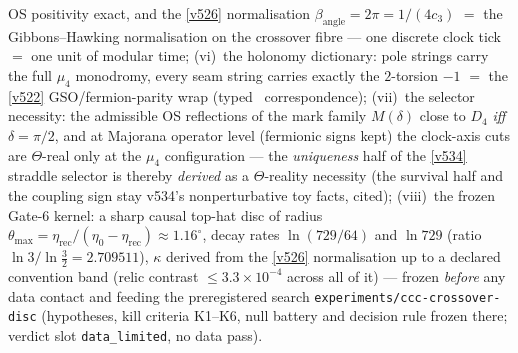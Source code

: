\documentclass[11pt,a4paper]{article}
\newcommand{\cthree}{c_3}
\begin{document}
OS positivity exact, and the \vref{v526} normalisation $\beta_{\mathrm{angle}}=2\pi=1/(4\cthree)$
$=$ the Gibbons--Hawking normalisation on the crossover fibre --- one discrete clock tick $=$ one
unit of modular time; (vi)~the holonomy dictionary: pole strings carry the full $\mu_4$ monodromy,
every seam string carries exactly the $2$-torsion $-1$ $=$ the \vref{v522} GSO/fermion-parity wrap
(typed \mC\ correspondence); (vii)~the selector necessity: the admissible OS reflections of the
mark family $M(\delta)$ close to $D_4$ \emph{iff} $\delta=\pi/2$, and at Majorana operator level
(fermionic signs kept) the clock-axis cuts are $\Theta$-real only at the $\mu_4$ configuration ---
the \emph{uniqueness} half of the \vref{v534} straddle selector is thereby \emph{derived} as a
$\Theta$-reality necessity (the survival half and the coupling sign stay v534's nonperturbative toy
facts, cited); (viii)~the frozen Gate-6 kernel: a sharp causal top-hat disc of radius
$\theta_{\max}=\eta_{\mathrm{rec}}/(\eta_0-\eta_{\mathrm{rec}})\approx1.16^\circ$, decay rates
$\ln(729/64)$ and $\ln729$ (ratio $\ln3/\ln\tfrac32=2.709511$), $\kappa$ derived from the
\vref{v526} normalisation up to a declared convention band (relic contrast $\le3.3\times10^{-4}$
across all of it) --- frozen \emph{before} any data contact and feeding the preregistered search
\texttt{experiments/ccc-crossover-disc} (hypotheses, kill criteria K1--K6, null battery and
decision rule frozen there; verdict slot \texttt{data\_limited}, no data pass).
\end{document}
